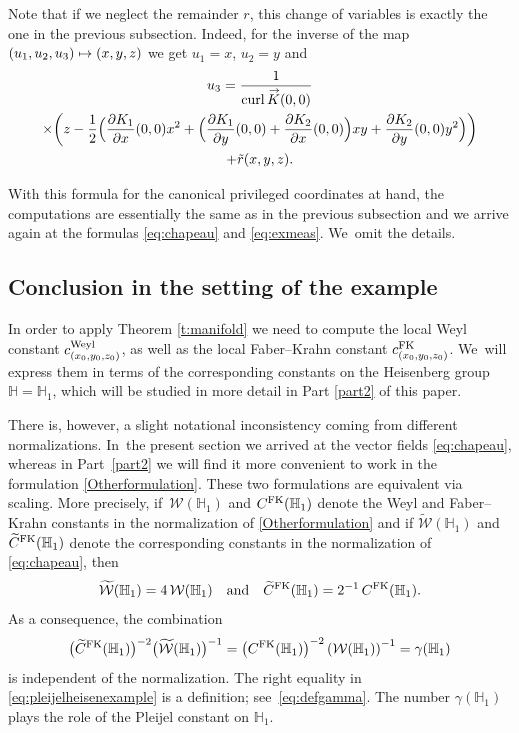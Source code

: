 \documentclass[10pt]{amsart}
\newcommand\mto{\mathchoice{\longmapsto}{\mapsto}{\mapsto}{\mapsto}}
\newcommand{\FK}{\textup{FK}}
\newcommand{\Weyl}{\textup{Weyl}}
\DeclareMathOperator{\curl}{curl}
\renewcommand{\vec}[1]
{\overset{\,{\raisebox{-2pt}{$\scriptstyle\to$}}}{#1}}
\theoremstyle{definition}
\newcommand{\1}{\mathbbm{1}}
\begin{document}
Note that if we neglect the remainder $r$, this change of variables is exactly the one in the previous subsection. Indeed, for the inverse of the map $(u_1,u_2,u_3)\mto (x,y,z)$ we get $u_1=x$, $u_2=y$ and
\begin{multline*}
u_3 = \frac{1}{\curl \vec K (0,0)}\\
\times\biggl(z - \frac12 \Bigl(\frac{\partial K_1}{\partial x}(0,0) x^2+ \Bigl(\frac{\partial K_1}{\partial y}(0,0) + \frac{\partial K_2}{\partial x}(0,0) \Bigr) xy
+ \frac{\partial K_2}{\partial y}(0,0) y^2\Bigr) \biggr) \\
+ \tilde r(x,y,z).
\end{multline*}

With this formula for the canonical privileged coordinates at hand, the computations are essentially the same as in the previous subsection and we arrive again at the formulas \eqref{eq:chapeau} and \eqref{eq:exmeas}. We~omit the details.

\subsection{Conclusion in the setting of the example}\label{sec:exampleconclusion}
In order to apply Theorem \ref{t:manifold} we need to compute the local Weyl constant $c^\Weyl_{(x_0,y_0,z_0)}$, as well as the local Faber--Krahn constant $c_{(x_0,y_0,z_0)}^\FK$. We~will express them in terms of the corresponding constants on the Heisenberg group $\mathbb H = \mathbb H_1$, which will be studied in more detail in Part \ref{part2} of this paper.

There is, however, a slight notational inconsistency coming from different normalizations. In~the present section we arrived at the vector fields \eqref{eq:chapeau}, whereas in Part~\ref{part2} we will find it more convenient to work in the formulation \eqref{Otherformulation}. These two formulations are equivalent via scaling. More precisely, if~$\mathcal W(\mathbb H_1)$ and $C^\FK(\mathbb H_1)$ denote the Weyl and Faber--Krahn constants in the normalization of \eqref{Otherformulation} and if
$\widetilde{\mathcal W}(\mathbb H_1)$ and $\widetilde C^\FK(\mathbb H_1)$ denote the corresponding constants in the normalization of \eqref{eq:chapeau}, then
\[
\widetilde{\mathcal W}(\mathbb H_1) = 4\,\mathcal W(\mathbb H_1)
\quad\text{and}\quad
\widetilde C^\FK(\mathbb H_1) = 2^{-1}\,C^\FK(\mathbb H_1).
\]
As a consequence, the combination
\begin{equation}
\label{eq:pleijelheisenexample}
\bigl(\widetilde C^\FK(\mathbb H_1)\bigr)^{-2} \bigl(\widetilde{\mathcal W}(\mathbb H_1)\bigr)^{-1} = \left(C^\FK(\mathbb H_1)\right)^{-2} \left(\mathcal W(\mathbb H_1)\right)^{-1} = \gamma(\mathbb H_1)
\end{equation}
is independent of the normalization. The right equality in \eqref{eq:pleijelheisenexample} is a definition; see~\eqref{eq:defgamma}. The number $\gamma(\mathbb H_1)$ plays the role of the Pleijel constant on $\mathbb H_1$.
\end{document}
